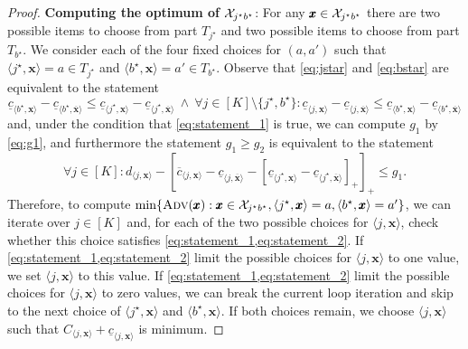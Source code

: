 \begin{proof}
\textbf{Computing the optimum of $\mathcal{X}_{j^\star b^\star}$}: 
For any $\pmb x \in \mathcal{X}_{j^\star b^\star}$ 
there are two possible items to choose from part $T_{j^\star}$ and two possible items to choose from part $T_{b^\star}$.
We consider each of the four fixed choices for $(a,a')$ such that $\langle j^\star,\pmb{x}\rangle = a \in T_{j^\star}$ and $\langle b^\star,\pmb{x}\rangle = a' \in T_{b^\star}$.
Observe that \cref{eq:jstar} and \cref{eq:bstar} are equivalent to the statement 
\begin{equation} \underline{c}_{\langle b^\star,\pmb{x}\rangle} - \underline{c}_{\langle b^\star,\overline{\pmb{x}}\rangle} \leq \underline{c}_{\langle j^\star,\pmb{x}\rangle} - \underline{c}_{\langle j^\star,\overline{\pmb{x}}\rangle} \ \land \ \forall j \in [K] \setminus \{j^\star, b^\star\} : \underline{c}_{\langle j,\pmb{x}\rangle} - \underline{c}_{\langle j, \overline{\pmb{x}}\rangle} \leq \underline{c}_{\langle b^\star,\pmb{x}\rangle} - \underline{c}_{\langle b^\star,\overline{\pmb{x}}\rangle} 
\label{eq:statement_1}
\end{equation}
and, under the condition that \cref{eq:statement_1} is true, we can compute $g_1$ by \cref{eq:g1}, and furthermore the statement $g_1 \geq g_2$ is equivalent to the statement 
\begin{equation}
\forall j \in [K] : d_{\langle j,\pmb{x}\rangle} - [\overline{c}_{\langle j,\pmb{x}\rangle}-\underline{c}_{\langle j, \overline{\pmb{x}}\rangle} - [\underline{c}_{\langle j^\star,\pmb{x}\rangle} - \underline{c}_{\langle j^\star,\overline{\pmb{x}}\rangle}]_+]_+ \leq g_1.
\label{eq:statement_2} 
\end{equation}
Therefore, to compute $\min\{\textsc{Adv}(\pmb x) : \pmb x  \in \mathcal{X}_{j^\star b^\star}, \langle j^\star,\pmb{x}\rangle = a, \langle b^\star,\pmb{x}\rangle = a'\}$,
we can iterate over $j \in [K]$ and, for each of the two possible choices for 
$\langle j,\pmb{x}\rangle$, check whether this choice satisfies \cref{eq:statement_1,eq:statement_2}.
If \cref{eq:statement_1,eq:statement_2} limit the possible choices for $\langle j,\pmb{x}\rangle$ to one value, we set $\langle j,\pmb{x}\rangle$ to this value. 
If \cref{eq:statement_1,eq:statement_2} limit the possible choices for $\langle j,\pmb{x}\rangle$ to zero values, we can break the current loop iteration and skip to the next choice of $\langle j^\star,\pmb{x}\rangle$ and $\langle b^\star,\pmb{x}\rangle$. 
If both choices remain, we choose $\langle j,\pmb{x}\rangle$ such that $C_{\langle j,\pmb{x}\rangle} + \underline{c}_{\langle j,\pmb{x}\rangle}$ is minimum.


\end{proof}
